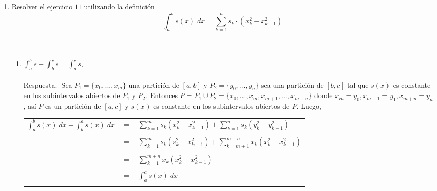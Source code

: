 \begin{enumerate}[ \bfseries 1.]
\item Resolver el ejercicio $11$ utilizando la definición $$\displaystyle\int_{a}^{b} s(x) \; dx = \sum\limits_{k=1}^{n} s_k \cdot (x_k^2 - x_{k-1}^2)$$\\\\
    
    \begin{enumerate}[\bfseries (a)]

	\item $\displaystyle\int_{a}^{b} s + \int_{b}^{c} s = \int_{a}^{c} s$.\\\\
	    Respuesta.-\; Sea $P_1=\lbrace x_0,...,x_m \rbrace$ una partición de $[a,b]$ y $P_2=\lbrace y_0,...,y_n \rbrace$ sea una partición de $[b,c]$ tal que $s(x)$ es constante en los subintervalos abiertos de $P_1$ y $P_2$. Entonces $P=P_1 \cup P_2 = \lbrace x_0,..., x_m,x_{m+1},...,x_{m+n} \rbrace$ donde $x_m = y_0, x_{m+1}=y_1, x_{m+n}=y_n$, así $P$ es un partición de $[a,c]$ y $s(x)$ es constante en los subintervalos abiertos de $P$. Luego, 
	    \begin{center}
		\begin{tabular}{rcl}
		    $\int_{a}^{b} s(x) \; dx + \int_{b}^{a} s(x) \; dx$&$=$&$\sum\limits_{k=1}^{m} s_k (x_k^2 - x_{k-1}^2) + \sum\limits_{k=1}^n s_k (y_k^2 - y_{k-1}^2) $\\\\
		    &$=$&$\sum\limits_{k=1}^m s_k(s_k^2 - x_{k-1}^2) + \sum\limits_{k=m+1}^{m+n} x_k (x_k^2 - x_{k-1}^2)$\\\\
		    &$=$&$\sum\limits_{k=1}^{m+n} x_k(x_k^2 - x_{k-1}^2)$\\\\
		    &$=$&$\displaystyle\int_{a}^{c} s(x) \; dx$\\\\
		\end{tabular}
	    \end{center}


\end{enumerate}
\end{enumerate}

